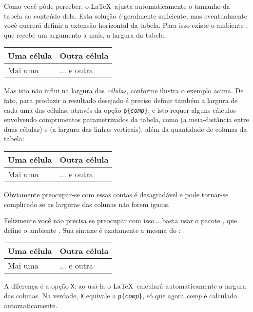 \documentclass[a4paper,12pt]{article}
\newcommand\tablecontent{%
		\hline
		Uma célula & Outra célula \tabularnewline
		\hline
		Mai uma    & ... e outra  \tabularnewline
		\hline
	}
\begin{document}
	Como você pôde perceber, o \LaTeX\ ajusta automaticamente o tamanho da tabela ao conteúdo dela. Esta solução é geralmente suficiente, mas eventualmente você quererá definir a extensão horizontal da tabela. Para isso existe o ambiente , que recebe um argumento a mais, a largura da tabela:	
	
	\medskip
	\noindent
	\begin{tabular*}{\textwidth}{|l|l|}
		\tablecontent
	\end{tabular*}
	\smallskip
	
	Mas isto não influi na largura das \emph{células}, conforme ilustra o exemplo acima. De fato, para produzir o resultado desejado é preciso definir também a largura de cada uma das células, através da opção \texttt{p\{\textrm{\textit{comp}}\}}, e isto requer alguns cálculos envolvendo comprimentos parametrizados da tabela, como  (a meia-distância entre duas células) e  (a largura das linhas verticais), além da quantidade de colunas da tabela:
	
	\newlength\colwidth
	\setlength{}
	
	\medskip
	\noindent
	\begin{tabular*}{\textwidth}{|p{\colwidth}|p{\colwidth}|}
		\tablecontent
	\end{tabular*}
	\smallskip
	
	Obviamente preocupar-se com essas contas é desagradável e pode tornar-se complicado se as larguras das colunas não forem iguais.
	
	Felizmente você não precisa se preocupar com isso... basta usar o pacote , que define o ambiente . Sua sintaxe é exatamente a mesma do :
	
	\medskip
	\noindent
	\begin{tabularx}{\textwidth}{|X|X|}
		\tablecontent
	\end{tabularx}
	\smallskip

	A diferença é a opção \texttt{X}: ao usá-la o \LaTeX\ calculará automaticamente a largura das colunas. Na verdade, \texttt{X} equivale a \texttt{p\{\textrm{\textit{comp}}\}}, só que agora \textit{comp} é calculado automaticamente.
\end{document}
